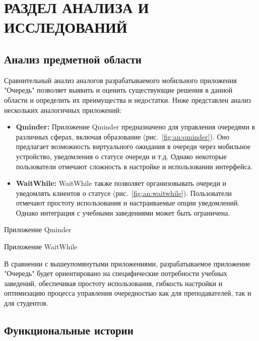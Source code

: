 \chapter{РАЗДЕЛ АНАЛИЗА И ИССЛЕДОВАНИЙ}

\section{Анализ предметной области}

Сравнительный анализ аналогов разрабатываемого мобильного приложения "Очередь"
позволяет выявить и оценить существующие решения в данной области
и определить их преимущества и недостатки.
Ниже представлен анализ нескольких аналогичных приложений:

\begin{itemize}
	\item \textbf{Qminder:} Приложение Qminder предназначено
		для управления очередями в различных сферах,
		включая образование (рис.~\ref{fig:an:qminder}).
		Оно предлагает возможность виртуального ожидания
		в очереди через мобильное устройство,
		уведомления о статусе очереди и т.д.
		Однако некоторые пользователи отмечают сложность в настройке
		и использовании интерфейса.
	\item \textbf{WaitWhile:} WaitWhile также позволяет организовывать
		очереди и уведомлять клиентов о статусе (рис.~\ref{fig:an:waitwhile}).
		Пользователи отмечают простоту использования
		и настраиваемые опции уведомлений.
		Однако интеграция с учебными заведениями может быть ограничена.
\end{itemize}

\begin{image}
	\caption{Приложение Qminder}
	\label{fig:an:qminder}
\end{image}

\begin{image}
	\caption{Приложение WaitWhile}
	\label{fig:an:waitwhile}
\end{image}

В сравнении с вышеупомянутыми приложениями,
разрабатываемое приложение "Очередь" будет ориентировано
на специфические потребности учебных заведений,
обеспечивая простоту использования, гибкость настройки
и оптимизацию процесса управления очередностью как для преподавателей,
так и для студентов.

\section{Функциональные истории}

